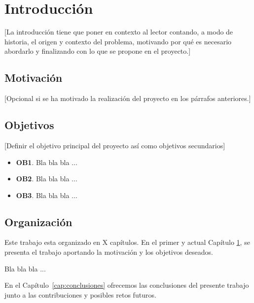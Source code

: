\chapter{Introducción}\label{cap:introduccion}

[La introducción tiene que poner en contexto al lector contando, a modo de historia, el origen y contexto del problema, motivando por qué es necesario abordarlo y finalizando con lo que se propone en el proyecto.]
\section{Motivación}
[Opcional si se ha motivado la realización del proyecto en los párrafos anteriores.]

\section{Objetivos}\label{sec:objetivos}

[Definir el objetivo principal del proyecto así como objetivos secundarios]

\begin{itemize}
    \item \textbf{OB1}. Bla bla bla ...
    \item \textbf{OB2}. Bla bla bla ...
    \item \textbf{OB3}. Bla bla bla ...
\end{itemize}

\section{Organización}

Este trabajo esta organizado en X capítulos. En el primer y actual Capítulo \ref{cap:introduccion}, se presenta el trabajo aportando la motivación y los objetivos deseados.

Bla bla bla ...

En el Capítulo~\ref{cap:conclusiones} ofrecemos las conclusiones del presente trabajo junto a las contribuciones y posibles retos futuros.